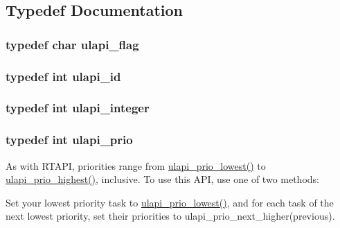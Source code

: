 \subsection{Typedef Documentation}
\hypertarget{ulapi_8hh_a0b364c37efe1ff57dd6c085291b67bec}{
\subsubsection[{ulapi\_\-flag}]{\setlength{\rightskip}{0pt plus 5cm}typedef char {\bf ulapi\_\-flag}}}
\label{ulapi_8hh_a0b364c37efe1ff57dd6c085291b67bec}
\hypertarget{ulapi_8hh_a382105adb3a098d4ff9dc973b2295555}{
\subsubsection[{ulapi\_\-id}]{\setlength{\rightskip}{0pt plus 5cm}typedef int {\bf ulapi\_\-id}}}
\label{ulapi_8hh_a382105adb3a098d4ff9dc973b2295555}
\hypertarget{ulapi_8hh_a110e6b8de916c218a17feafb79167f79}{
\subsubsection[{ulapi\_\-integer}]{\setlength{\rightskip}{0pt plus 5cm}typedef int {\bf ulapi\_\-integer}}}
\label{ulapi_8hh_a110e6b8de916c218a17feafb79167f79}
\hypertarget{ulapi_8hh_ab471b0bc25f71285fe3f8c262cfb8f56}{
\subsubsection[{ulapi\_\-prio}]{\setlength{\rightskip}{0pt plus 5cm}typedef int {\bf ulapi\_\-prio}}}
\label{ulapi_8hh_ab471b0bc25f71285fe3f8c262cfb8f56}
As with RTAPI, priorities range from \hyperlink{ulapi_8cpp_a6c2aee05434d26ba9db08f972209cd7f}{ulapi\_\-prio\_\-lowest()} to \hyperlink{ulapi_8cpp_ad8bced2eff1e366df83624e4c785bf14}{ulapi\_\-prio\_\-highest()}, inclusive. To use this API, use one of two methods:

Set your lowest priority task to \hyperlink{ulapi_8cpp_a6c2aee05434d26ba9db08f972209cd7f}{ulapi\_\-prio\_\-lowest()}, and for each task of the next lowest priority, set their priorities to ulapi\_\-prio\_\-next\_\-higher(previous).

